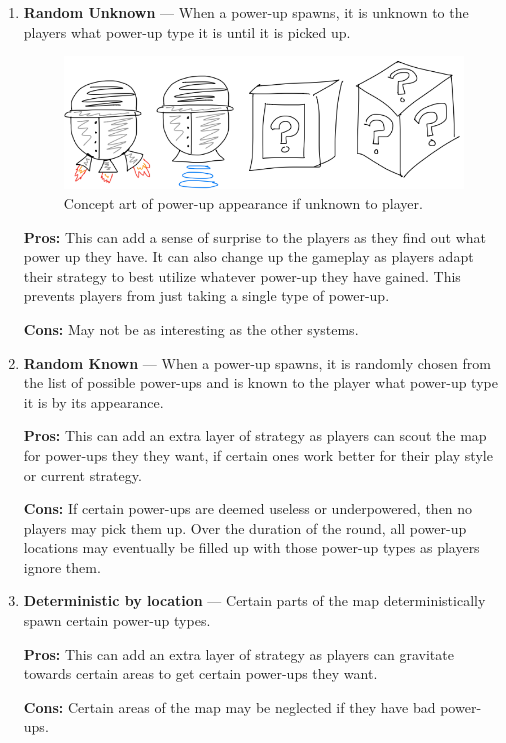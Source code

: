 \documentclass{article}
\theoremstyle{definition}
\begin{document}
\begin{enumerate}
  \item \textbf{Random Unknown} --- When a power-up spawns, it is unknown to
    the players what power-up type it is until it is picked up.

\begin{figure}[htpb]
  \centering
  \includegraphics[width=0.8\linewidth]{images/powerups_unknown.png}
  \caption{Concept art of power-up appearance if unknown to player.}
\label{fig:powerups_unknown}
\end{figure}

    \textbf{Pros:} This can add a sense of surprise to the players as they find
    out what power up they have. It can also change up the gameplay as players
    adapt their strategy to best utilize whatever power-up they have gained.
    This prevents players from just taking a single type of power-up.

    \textbf{Cons:} May not be as interesting as the other systems.
  \item \textbf{Random Known} --- When a power-up spawns, it is randomly chosen
    from the list of possible power-ups and is known to the player what
    power-up type it is by its appearance.

    \textbf{Pros:} This can add an extra layer of strategy as players can
    scout the map for power-ups they they want, if certain ones work better
    for their play style or current strategy.

    \textbf{Cons:} If certain power-ups are deemed useless or underpowered,
    then no players may pick them up. Over the duration of the round, all
    power-up locations may eventually be filled up with those power-up types as
    players ignore them.
  \item \textbf{Deterministic by location} --- Certain parts of the map
    deterministically spawn certain power-up types.

    \textbf{Pros:} This can add an extra layer of strategy as players can
    gravitate towards certain areas to get certain power-ups they want.

    \textbf{Cons:} Certain areas of the map may be neglected if they have bad
    power-ups.
\end{enumerate}
\end{document}
